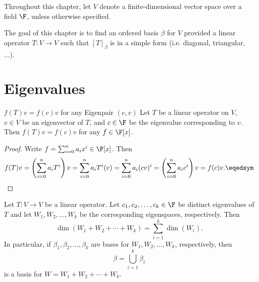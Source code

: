 \documentclass[linearalgebra]{subfiles}
\begin{document}

    \begin{remark}
        Throughout this chapter, let $V$ denote a finite-dimensional vector space over a field $\F$, unless otherwise specified.
    \end{remark}

    \begin{remark}
        The goal of this chapter is to find an ordered basis $\beta$ for $V$ provided a linear operator $T:V\to V$ such that $\left[ T \right] _\beta$ is in a simple form (i.e. diagonal, triangular, ...).
    \end{remark}

    \section{Eigenvalues}

    \begin{prop}{$f(T)v = f(c)v$ for any Eigenpair $(c,v)$}
        Let $T$ be a linear operator on $V$, $v\in V$ be an eigenvector of $T$, and $c\in \F$ be the eigenvalue corresponding to $v$. Then $f(T)v = f(c)v$ for any $f\in \F[x]$.
    \end{prop}

    \begin{proof}
        Write $f = \sum^{n}_{i=0} a_ix^i \in \F[x]$. Then
        \begin{equation*}
            f(T)v = \left( \sum^{n}_{i=0} a_iT^i \right) v = \sum^{n}_{i=0} a_iT^i(v) = \sum^{n}_{i=0} a_i(cv)^i = \left( \sum^{n}_{i=0} a_ic^i \right) v = f(c)v. \eqedsym
        \end{equation*}
    \end{proof}

    \begin{prop}{}
        Let $T:V\to V$ be a linear operator. Let $c_1, c_2, \ldots, c_k\in \F$ be distinct eigenvalues of $T$ and let $W_1, W_2, \ldots, W_k$ be the corresponding eigenspaces, respectively. Then
        \begin{equation*}
            \dim \left( W_1 + W_2 + \cdots + W_k \right) = \sum^{k}_{i=1} \dim(W_i). 
        \end{equation*}
        In particular, if $\beta_1, \beta_2, \ldots, \beta_k$ are bases for $W_1, W_2, \ldots, W_k$, respectively, then
        \begin{equation*}
            \beta = \bigcup^{k}_{i=1} \beta_i
        \end{equation*}
        is a basis for $W = W_1 + W_2 + \cdots + W_k$.
    \end{prop}
\end{document}
